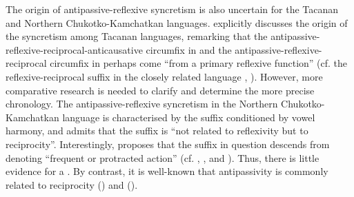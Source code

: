 The origin of antipassive-reflexive syncretism is also uncertain for the Tacanan and Northern Chukotko-Kamchatkan languages. \cite[525]{vuillermet:2012} explicitly discusses the origin of the syncretism among Tacanan languages, remarking that the antipassive-reflexive-reciprocal-anticausative circumfix  in  and the antipassive-reflexive-reciprocal circumfix  in  perhaps come “from a primary reflexive function” (cf. the reflexive-reciprocal suffix  in the closely related language , \citealt[555ff.]{emkow:2006}). However, more comparative research is needed to clarify and determine the more precise chronology. The antipassive-reflexive syncretism in the Northern Chukotko-Kamchatkan language  is characterised by the suffix  conditioned by vowel harmony, and \cite[167]{janic:2010} admits that the suffix is “not related to reflexivity but to reciprocity”. Interestingly, \cite[423]{fortescue:2005} proposes that the suffix in question descends from   denoting “frequent or protracted action” (cf.   ,  , and  ). Thus, there is little evidence for a . By contrast, it is well-known that antipassivity is commonly related to reciprocity () and  (\citealt{polinsky:2017}).

